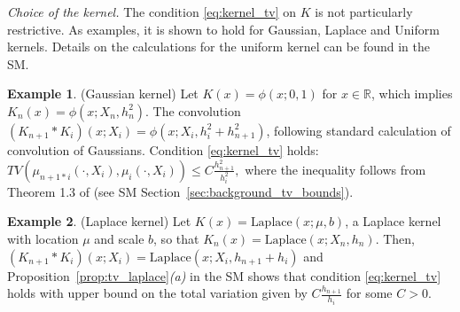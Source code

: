 \documentclass{article}
\theoremstyle{definition}
\newtheorem{example}{Example}
\newcommand{\di}{{\rm d}}
\renewcommand{\&}{and}
\begin{document}
\textit{Choice of the kernel.} The condition \eqref{eq:kernel_tv} on $K$ is not particularly restrictive. As examples, it is shown to hold for Gaussian, Laplace and Uniform kernels. Details on the calculations for the uniform kernel can be found in the SM. 

\begin{example} (Gaussian kernel)  Let $K(x) = \phi(x;0,1)$ for $x\in \mathbb{R}$, which implies $K_n(x)=\phi(x;X_n,h_n^2)$. The convolution $(K_{n+1} * K_{i})(x;X_i)=\phi(x;X_{i}, h_{i}^{2}+h_{n+1}^{2})$, %
	following standard calculation of convolution of Gaussians. Condition \eqref{eq:kernel_tv} holds: $TV(\mu_{n+1*i}(\cdot,X_i), \mu_{i} (\cdot,X_i))\leq C \frac{h_{n+1}^2}{h_i^2},$
	where the inequality follows from Theorem 1.3 of \cite{devroye2018total} (see SM Section~\ref{sec:background_tv_bounds}). 
\end{example}

\begin{example}\label{ex:laplace} (Laplace kernel) Let $K(x)=\text{Laplace}(x;\mu,b)$, a Laplace kernel with location $\mu$ and scale $b$, so that
 $K_n(x)=\text{Laplace}(x;X_n,h_n)$. Then, $(K_{n+1} * K_{i})(x;X_i)=\text{Laplace}(x;X_i,h_{n+1}+h_i)$ %
 and  Proposition~\ref{prop:tv_laplace}\textit{(a)} in the SM shows that  condition \eqref{eq:kernel_tv} holds with upper bound on the total variation given by  $C\frac{h_{n+1}}{h_i}$ for some $C>0$.
\end{example}
\vspace{0.3cm}
\end{document}
